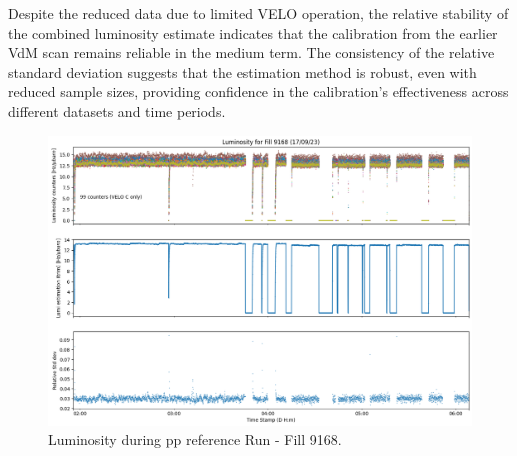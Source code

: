 Despite the reduced data due to limited VELO operation, the relative stability of the combined luminosity estimate indicates that the calibration from the earlier VdM scan remains reliable in the medium term. The consistency of the relative standard deviation suggests that the estimation method is robust, even with reduced sample sizes, providing confidence in the calibration's effectiveness across different datasets and time periods.


\begin{figure}
    \centering
    \includegraphics[width=\textwidth]{figures/fill9168.png}
    \caption{Luminosity during pp reference Run - Fill 9168.}
    \label{fig:fill9168}
\end{figure}